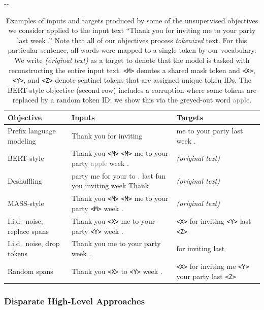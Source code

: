 \documentclass[twoside,11pt]{article}
\newlength{\offsetpage}
\newenvironment{widepage}{\begin{adjustwidth}{-\offsetpage}{-\offsetpage}
    \addtolength{\textwidth}{2\offsetpage}}
{\end{adjustwidth}}
\begin{document}
\begin{table}
\footnotesize
\begin{widepage}
\centering
\begin{tabular}{l l l}
\toprule
    Objective & Inputs & Targets   \\
\midrule
    Prefix language modeling & Thank you for inviting & me to your party last week . \\
    BERT-style \cite{devlin2018bert} & Thank you \texttt{<M>} \texttt{<M>} me to your party \textcolor{gray}{apple} week . & \textit{(original text)}  \\
    Deshuffling & party me for your to . last fun you inviting week Thank & \textit{(original text)} \\
    MASS-style \cite{song2019mass} & Thank you \texttt{<M>} \texttt{<M>} me to your party \texttt{<M>} week . & \textit{(original text)} \\
    I.i.d.\ noise, replace spans & Thank you \texttt{<X>} me to your party \texttt{<Y>} week . & \texttt{<X>} for inviting \texttt{<Y>} last \texttt{<Z>} \\
    I.i.d.\ noise, drop tokens & Thank you me to your party week . & for inviting last \\
    Random spans & Thank you \texttt{<X>} to \texttt{<Y>} week . & \texttt{<X>} for inviting me \texttt{<Y>} your party last \texttt{<Z>} \\
\bottomrule
\end{tabular}
\end{widepage}
\caption{
Examples of inputs and targets produced by some of the unsupervised objectives we consider applied to the input text ``Thank you for inviting me to your party last week .''
Note that all of our objectives process \textit{tokenized} text. For this particular sentence, all words were mapped to a single token by our vocabulary.
We write \textit{(original text)} as a target to denote that the model is tasked with reconstructing the entire input text.
\texttt{<M>} denotes a shared mask token and \texttt{<X>}, \texttt{<Y>}, and \texttt{<Z>} denote sentinel tokens that are assigned unique token IDs.
The BERT-style objective (second row) includes a corruption where some tokens are replaced by a random token ID; we show this via the greyed-out word \textcolor{gray}{apple}.
}
\label{tab:objectives}
\end{table}

\subsubsection{Disparate High-Level Approaches}
\label{sec:objectives_highlevel}
\end{document}
